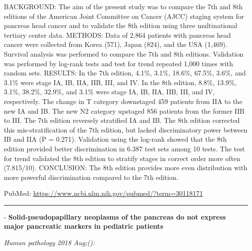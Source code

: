 \documentclass[]{article}
\begin{document}
BACKGROUND: The aim of the present study was to compare the 7th and 8th
editions of the American Joint Committee on Cancer (AJCC) staging system
for pancreas head cancer and to validate the 8th edition using three
multinational tertiary center data. METHODS: Data of 2,864 patients with
pancreas head cancer were collected from Korea (571), Japan (824), and
the USA (1,469). Survival analysis was performed to compare the 7th and
8th editions. Validation was performed by log-rank tests and test for
trend repeated 1,000 times with random sets. RESULTS: In the 7th
edition, 4.1\%, 3.1\%, 18.6\%, 67.5\%, 3.6\%, and 3.1\% were stage IA,
IB, IIA, IIB, III, and IV. In the 8th edition, 8.8\%, 13.9\%, 3.1\%,
38.2\%, 32.9\%, and 3.1\% were stage IA, IB, IIA, IIB, III, and IV,
respectively. The change in T category downstaged 459 patients from IIA
to the new IA and IB. The new N2 category upstaged 856 patients from the
former IIB to III. The 7th edition reversely stratified IA and IB. The
8th edition corrected this mis-stratification of the 7th edition, but
lacked discriminatory power between IB and IIA (P = 0.271). Validation
using the log-rank showed that the 8th edition provided better
discrimination in 6.387 test sets among 10 tests. The test for trend
validated the 8th edition to stratify stages in correct order more often
(7.815/10). CONCLUSION: The 8th edition provides more even distribution
with more powerful discrimination compared to the 7th edition.

PubMed: \url{https://www.ncbi.nlm.nih.gov/pubmed/?term=30118171}

{}

{}

\begin{center}\rule{0.5\linewidth}{\linethickness}\end{center}

 - \textbf{Solid-pseudopapillary neoplasms of the pancreas do not
express major pancreatic markers in pediatric patients}

\emph{Human pathology 2018 Aug;():}
\end{document}
